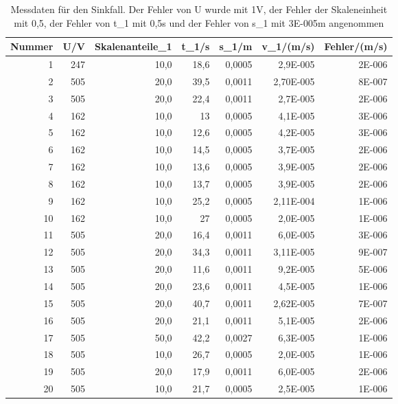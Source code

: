 \documentclass[12pt]{scrartcl}
\begin{document}
\begin{table}[H]
\caption{Messdaten für den Sinkfall. Der Fehler von U wurde mit 1V, der Fehler der Skaleneinheit mit 0,5, der Fehler von t\_1 mit 0,5s und der Fehler von s\_1 mit 3E-005m angenommen}
\begin{center}
\begin{tabular}{|r|r|r|r|r|r|r|}
\hline
\multicolumn{1}{|l|}{Nummer} & \multicolumn{1}{|l|}{U/V} & \multicolumn{1}{l|}{Skalenanteile\_1} & \multicolumn{1}{l|}{t\_1/s} & \multicolumn{1}{l|}{s\_1/m} & \multicolumn{1}{l|}{v\_1/(m/s)} & \multicolumn{1}{l|}{Fehler/(m/s)} \\ \hline
1 & 247 & 10,0 & 18,6 & 0,0005 & 2,9E-005 & 2E-006 \\ \hline
2 & 505 & 20,0 & 39,5 & 0,0011  & 2,70E-005 & 8E-007 \\ \hline
3 & 505 & 20,0 & 22,4 & 0,0011 & 2,7E-005  & 2E-006 \\ \hline
4 & 162 & 10,0 & 13 & 0,0005  & 4,1E-005 & 3E-006 \\ \hline
5 & 162 & 10,0 & 12,6 & 0,0005  & 4,2E-005 & 3E-006 \\ \hline
6 & 162 & 10,0 & 14,5 & 0,0005  & 3,7E-005 & 2E-006 \\ \hline
7 & 162 & 10,0 & 13,6 & 0,0005  & 3,9E-005 & 2E-006 \\ \hline
8 & 162 & 10,0 & 13,7 & 0,0005  & 3,9E-005 & 2E-006 \\ \hline
9 & 162 & 10,0 & 25,2 & 0,0005  & 2,11E-004 & 1E-006 \\ \hline
10 & 162 & 10,0 & 27 & 0,0005  & 2,0E-005 & 1E-006 \\ \hline
11 & 505 & 20,0 & 16,4 & 0,0011  & 6,0E-005 & 3E-006 \\ \hline
12 & 505 & 20,0 & 34,3 & 0,0011  & 3,11E-005 & 9E-007 \\ \hline
13 & 505 & 20,0 & 11,6 & 0,0011  & 9,2E-005 & 5E-006 \\ \hline
14 & 505 & 20,0 & 23,6 & 0,0011  & 4,5E-005 & 1E-006 \\ \hline
15 & 505 & 20,0 & 40,7 & 0,0011  & 2,62E-005 & 7E-007 \\ \hline
16 & 505 & 20,0 & 21,1 & 0,0011  & 5,1E-005 & 2E-006 \\ \hline
17 & 505 & 50,0 & 42,2 & 0,0027  & 6,3E-005 & 1E-006 \\ \hline
18 & 505 & 10,0 & 26,7 & 0,0005  & 2,0E-005 & 1E-006 \\ \hline
19 & 505 & 20,0 & 17,9 & 0,0011  & 6,0E-005 & 2E-006 \\ \hline
20 & 505 & 10,0 & 21,7 & 0,0005  & 2,5E-005 & 1E-006 \\ \hline

\end{tabular}
\end{center}
\end{table}
\end{document}
